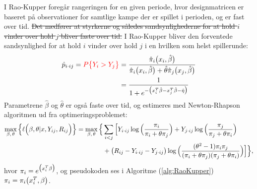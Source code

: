 \documentclass[11pt,a4paper]{article}
\begin{document}
I Rao-Kupper foregår rangeringen for en given periode, hvor designmatricen er baseret på observationer for samtlige kampe der er spillet i perioden, og er fast over tid. \sout{Det medfører at styrkerne og således sandsynlighederne for at hold $i$ vinder over hold $j$ bliver faste over tid.} I Rao-Kupper bliver den forventede sandsynlighed for at hold $i$ vinder over hold $j$ i en hvilken som helst spillerunde:
\begin{align}
    \hat{p}_{i\cdot ij}=\textcolor{red}{{P\big{\{}Y_i>Y_j\big{\}}}}
    &=\frac{\hat{\pi}_i\big{(}x_i,\hat{\beta}\big{)}}{\hat{\pi}_i\big{(}x_i,\hat{\beta}\big{)}+\hat{\theta}\hat{\pi}_j\big{(}x_j,\hat{\beta}\big{)}}\\
    &=\frac{1}{1+e^{-\big{(}x_i^T\hat{\beta}-x_j^T\hat{\beta}-\hat{\eta}\big{)}}}
\end{align}
Parametrene $\hat{\beta}$ og $\hat{\theta}$ er også faste over tid, og estimeres med Newton-Rhapson algoritmen ud fra optimeringsproblemet:
\begin{align*}
\max_{\beta,\,\theta} \Big{\{}\ell\Big{(}\beta,\theta|x,Y_{ij},R_{ij}\Big{)}\Big{\}}=
\max_{\beta,\,\theta} \Big{\{}& \sum_{i<j}\Big{[}Y_{i\cdot ij}\log\Big{(}\frac{\pi_i}{\pi_i+\theta\pi_j}\Big{)}
+ Y_{j\cdot ij}\log\Big{(}\frac{\pi_j}{\pi_j+\theta\pi_i}\Big{)}\\
&+ \big{(}R_{ij}-Y_{i\cdot ij}-Y_{j\cdot ij}\big{)} \log\Big{(}\frac{(\theta^2-1)\pi_i \pi_j}{(\pi_i+\theta\pi_j)(\pi_j+\theta\pi_i)}\Big{)}\Big{]}\Big{\}},\\
\end{align*}
 hvor $\pi_i=e^{\big{(}x_i^T\beta\big{)}}$, og pseudokoden ses i Algoritme (\ref{alg:RaoKupper})\sout{$\pi_i=\pi_i\big{(}x_i^T,\beta\big{)}$}.
 \\
 
\end{document}
